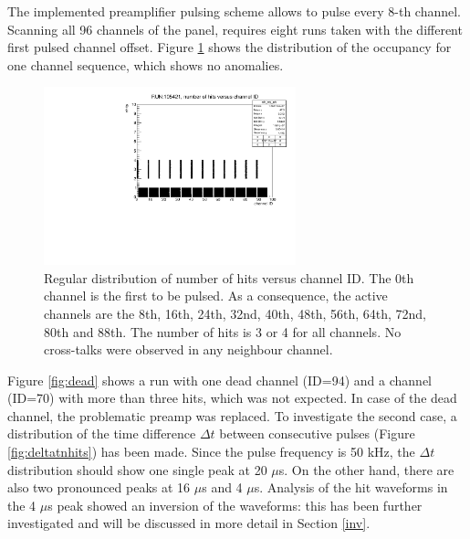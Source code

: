 The implemented preamplifier pulsing scheme allows to pulse every 8-th channel. 
Scanning all 96 channels of the panel, 
requires eight runs taken with the different first pulsed channel offset.
Figure \ref{fig:normalhits} shows the 
distribution of the occupancy for one channel 
sequence, which shows no anomalies.
\begin{figure}[!h]
      \centering
      \includegraphics[width=0.65\textwidth]{figures/pdf/run105421_nh_vs_ch.pdf}
      \caption[The regular occupancy plot.]{Regular distribution of number of hits versus channel ID. 
      The 0th channel is the first to be pulsed.
      As a consequence, the active channels are the 8th, 16th, 24th, 
      32nd, 40th, 48th, 56th, 64th, 72nd, 80th and 88th. 
      The number of hits is 3 or 4 for all channels. 
      No cross-talks were observed in any neighbour channel.}
     \label{fig:normalhits}
\end{figure}
Figure \ref{fig:dead} shows a run with one dead channel (ID=94) 
and a channel (ID=70) with more than 
three hits, which was not expected. 
In case of the dead channel, the problematic preamp  
was replaced. To investigate the second case, 
a distribution of the time difference 
$\Delta t$ between consecutive pulses 
(Figure \ref{fig:deltatnhits}) has been made.
Since the pulse frequency is 50 kHz, the $\Delta t$ 
distribution should show one single peak at 20 $\mu$s. 
On the other hand, there are also two 
pronounced peaks at 16 $\mu$s and 4 $\mu$s. 
Analysis of the hit waveforms in the 4 $\mu$s peak 
showed an inversion of the waveforms: 
this has been further investigated 
and will be discussed in more detail in Section \ref{inv}.
